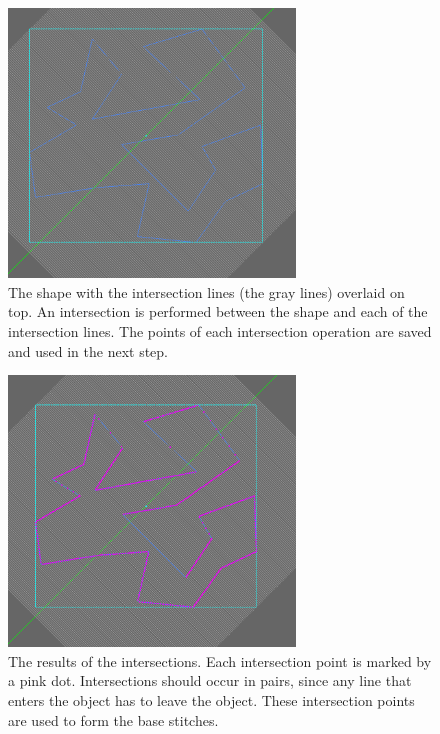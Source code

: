 \documentclass{article}
\begin{document}
\begin{figure}[H]
    \centering
    \includegraphics[width=3in]{p1}
    \caption{The shape with the intersection lines (the gray lines) overlaid on top. An intersection is performed between the shape and each of the intersection lines. The points of each intersection operation are saved and used in the next step.}
    \label{p1}
\end{figure}

\begin{figure}[H]
    \centering
    \includegraphics[width=3in]{p2}
    \caption{The results of the intersections. Each intersection point is marked by a pink dot. Intersections should occur in pairs, since any line that enters the object has to leave the object. These intersection points are used to form the base stitches.}
    \label{p2}
\end{figure}
\end{document}
